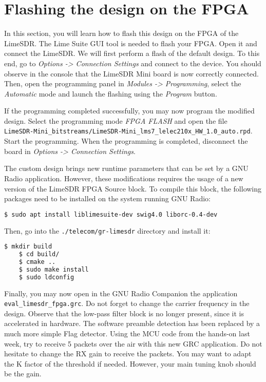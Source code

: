 


\section{Flashing the design on the FPGA}

 In this section, you will learn how to flash this design on the FPGA of the LimeSDR. The Lime Suite GUI tool is needed to flash your FPGA. Open it and connect the LimeSDR. We will first perform a flash of the default design. To this end, go to \textit{Options -> Connection Settings} and connect to the device. You should observe in the console that the LimeSDR Mini board is now correctly connected. Then, open the programming panel in \textit{Modules -> Programming}, select the \textit{Automatic} mode and launch the flashing using the \textit{Program} button.

If the programming completed successfully, you may now program the modified design. Select the programming mode \textit{FPGA FLASH} and open the file \\ \texttt{LimeSDR-Mini\_bitstreams/LimeSDR-Mini\_lms7\_lelec210x\_HW\_1.0\_auto.rpd}. Start the programming. When the programming is completed, disconnect the board in \textit{Options -> Connection Settings}.

The custom design brings new runtime parameters that can be set by a GNU Radio application. However, these modifications requires the usage of a new version of the LimeSDR FPGA Source block. To compile this block, the following packages need to be installed on the system running GNU Radio:
\begin{lstlisting}[language=bash]
    $ sudo apt install liblimesuite-dev swig4.0 liborc-0.4-dev
\end{lstlisting}
Then, go into the \texttt{./telecom/gr-limesdr} directory and install it:
\begin{lstlisting}[language=bash]
    $ mkdir build
    $ cd build/
    $ cmake ..
    $ sudo make install
    $ sudo ldconfig
\end{lstlisting}

Finally, you may now open in the GNU Radio Companion the application \texttt{eval\_limesdr\_fpga.grc}. Do not forget to change the carrier frequency in the design. Observe that the low-pass filter block is no longer present, since it is accelerated in hardware. The software preamble detection has been replaced by a much more simple Flag detector. Using the MCU code from the hands-on last week, try to receive 5 packets over the air with this new GRC application. Do not hesitate to change the RX gain to receive the packets. You may want to adapt the K factor of the threshold if needed. However, your main tuning knob should be the gain.



